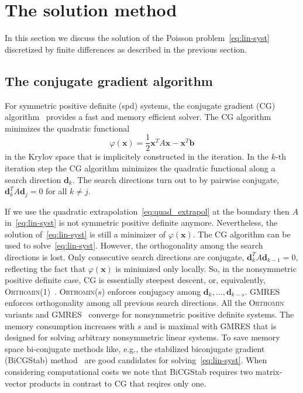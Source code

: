 \section{The solution method}
\label{sec:method}

In this section we discuss the solution of the Poisson
problem~\eqref{eq:lin-syst} discretized by finite differences as
described in the previous section.

\subsection{The conjugate gradient algorithm}

For symmetric positive definite (spd) systems, the conjugate gradient
(CG) algorithm~\cite{hest:52} provides a fast and memory efficient
solver.  The CG algorithm minimizes the quadratic functional
\begin{equation} \label{eq:cg-funct}
  \varphi(\mathbf{x}) = \frac{1}{2}\mathbf{x}^T A \mathbf{x} - \mathbf{x}^T
  \mathbf{b}
\end{equation}
in the Krylov space that is implicitely constructed in the iteration.
In the $k$-th iteration step the CG algorithm minimizes the quadratic
functional along a search direction $\mathbf{d}_k$.  The search
directions turn out to by pairwise conjugate, $\mathbf{d}_k^T A
\mathbf{d}_j = 0$ for all $k\neq j$.

If we use the quadratic extrapolation~\eqref{eq:quad_extrapol} at the
boundary then $A$ in~\eqref{eq:lin-syst} is not symmetric positive
definite anymore.  Nevertheless, the solution of~\eqref{eq:lin-syst} is
still a minimizer of $\varphi(\mathbf{x})$.  The CG algorithm can be
used to solve~\eqref{eq:lin-syst}.  However, the orthogonality among the
search directions is lost.  Only consecutive search directions are
conjugate, $\mathbf{d}_k^T A \mathbf{d}_{k-1} = 0$, reflecting the fact
that $\varphi(\mathbf{x})$ is minimized only locally.  So, in the
nonsymmetric positive definite case, CG is essentially steepest descent,
or, equivalently, \textsc{Orthomin}(1)~\cite{yoje:80}.
\textsc{Orthomin}($s$) enforces conjugacy among $\mathbf{d}_k, \ldots,
\mathbf{d}_{k-s}$.  GMRES enforces orthogonality among all previous
search directions.  All the \textsc{Orthomin} variants and
GMRES~\cite{sasc:86} converge for nonsymmetric positive definite
systems.  The memory consumption increases with $s$ and is maximal with
GMRES that is designed for solving arbitrary nonsymmetric linear
systems.  To save memory space bi-conjugate methods like, e.g., the
stabilized biconjugate gradient (BiCGStab) method~\cite{vors:92} are
good candidates for solving~\eqref{eq:lin-syst}.  When considering
computational costs we note that BiCGStab requires two matrix-vector
products in contrast to CG that reqires only one.

